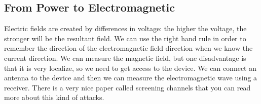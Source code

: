\subsection { From Power to Electromagnetic }
Electric fields are created by differences in voltage: the higher the voltage, the stronger will be the resultant field. We can use the right hand rule in order to remember the direction of the electromagnetic field direction when we know the current direction. We can measure the magnetic field, but one disadvantage is that it is very localize, so we need to get access to the device. We can connect an antenna to the device and then we can measure the electromagnetic wave using a receiver. There is a very nice paper called screening channels that you can read more about this kind of attacks.

